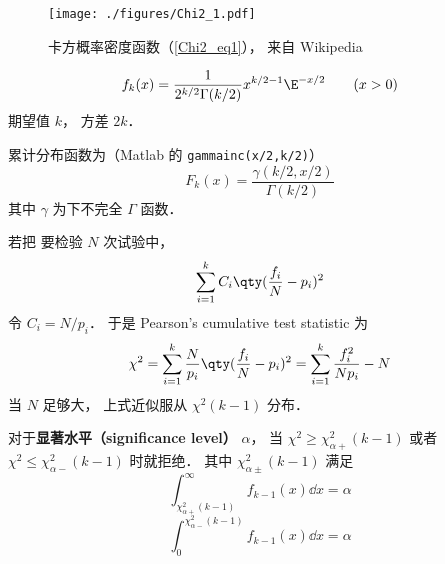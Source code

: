 
\begin{issues}
\issueDraft
\end{issues}

\begin{figure}[ht]
\centering
\texttt{[image: ./figures/Chi2\_1.pdf]}
\caption{卡方概率密度函数（\autoref{Chi2_eq1}）， 来自 Wikipedia} \label{Chi2_fig1}
\end{figure}

\begin{equation}\label{Chi2_eq1}
f_k(x) = \frac{1}{2^{k/2}\Gamma(k/2)}x^{k/2-1}\E^{-x/2} \qquad (x > 0)
\end{equation}
期望值 $k$， 方差 $2k$．

累计分布函数为（Matlab 的 \verb|gammainc(x/2,k/2)|）
\begin{equation}
F_k(x) = \frac{\gamma(k/2, x/2)}{\Gamma(k/2)}
\end{equation}
其中 $\gamma$ 为下不完全 $\Gamma$ 函数．


若把 要检验 $N$ 次试验中， 
\begin{equation}
\sum_{i=1}^k C_i \qty(\frac{f_i}{N} - p_i)^2
\end{equation}
令 $C_i = N/p_i$． 于是 Pearson's cumulative test statistic 为
\begin{equation}
\chi^2 = \sum_{i=1}^k \frac{N}{p_i} \qty(\frac{f_i}{N} - p_i)^2 = \sum_{i=1}^k \frac{f_i^2}{Np_i} - N
\end{equation}
当 $N$ 足够大， 上式近似服从 $\chi^2(k-1)$ 分布．

对于\textbf{显著水平（significance level）} $\alpha$， 当 $\chi^2 \geqslant \chi_{\alpha+}^2(k-1)$ 或者 $\chi^2 \leqslant \chi_{\alpha-}^2(k-1)$ 时就拒绝． 其中 $\chi_{\alpha\pm}^2(k-1)$ 满足
\begin{equation}
\int_{\chi_{\alpha+}^2(k-1)}^\infty f_{k-1}(x) \dd{x} = \alpha
\end{equation}
\begin{equation}
\int_0^{\chi_{\alpha-}^2(k-1)} f_{k-1}(x) \dd{x} = \alpha
\end{equation}

